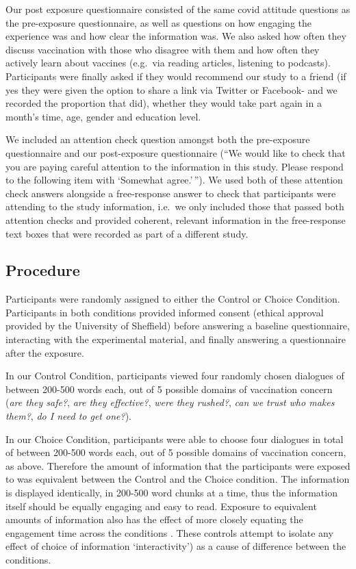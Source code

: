 \documentclass[
  english,
  ,jou,floatsintext]{apa6}
\begin{document}
Our post exposure questionnaire consisted of the same covid attitude questions as the pre-exposure questionnaire, as well as questions on how engaging the experience was and how clear the information was. We also asked how often they discuss vaccination with those who disagree with them and how often they actively learn about vaccines (e.g.~via reading articles, listening to podcasts). Participants were finally asked if they would recommend our study to a friend (if yes they were given the option to share a link via Twitter or Facebook- and we recorded the proportion that did), whether they would take part again in a month's time, age, gender and education level.

We included an attention check question amongst both the pre-exposure questionnaire and our post-exposure questionnaire (``We would like to check that you are paying careful attention to the information in this study. Please respond to the following item with `Somewhat agree.'\,''). We used both of these attention check answers alongside a free-response answer to check that participants were attending to the study information, i.e.~we only included those that passed both attention checks and provided coherent, relevant information in the free-response text boxes that were recorded as part of a different study.

\hypertarget{procedure}{%
\subsection{Procedure}\label{procedure}}

Participants were randomly assigned to either the Control or Choice Condition. Participants in both conditions provided informed consent (ethical approval provided by the University of Sheffield) before answering a baseline questionnaire, interacting with the experimental material, and finally answering a questionnaire after the exposure.

In our Control Condition, participants viewed four randomly chosen dialogues of between 200-500 words each, out of 5 possible domains of vaccination concern (\emph{are they safe?}, \emph{are they effective?}, \emph{were they rushed?}, \emph{can we trust who makes them?}, \emph{do I need to get one?}).

In our Choice Condition, participants were able to choose four dialogues in total of between 200-500 words each, out of 5 possible domains of vaccination concern, as above. Therefore the amount of information that the participants were exposed to was equivalent between the Control and the Choice condition. The information is displayed identically, in 200-500 word chunks at a time, thus the information itself should be equally engaging and easy to read. Exposure to equivalent amounts of information also has the effect of more closely equating the engagement time across the conditions . These controls attempt to isolate any effect of choice of information `interactivity') as a cause of difference between the conditions.
\end{document}
